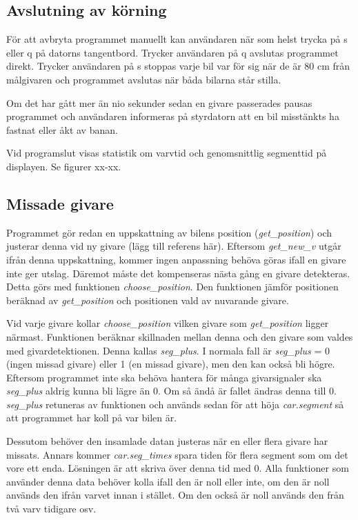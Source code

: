 \documentclass[10pt,oneside,swedish]{lips-no_customer}
\begin{document}
\subsection{Avslutning av körning}

För att avbryta programmet manuellt kan användaren när som helst trycka på s
eller q på datorns tangentbord. Trycker användaren på q avslutas programmet
direkt. Trycker användaren på s stoppas varje bil var för sig när de är 80 cm
från målgivaren och programmet avslutas när båda bilarna står stilla.

Om det har gått mer än nio sekunder sedan en givare passerades pausas programmet
och användaren informeras på styrdatorn att en bil misstänkts ha fastnat eller
åkt av banan. 

Vid programslut visas statistik om varvtid och genomsnittlig segmenttid på
displayen. Se figurer xx-xx.

\subsection{Missade givare}

Programmet gör redan en uppskattning av bilens position (\emph{get\_position})
 och justerar denna vid ny givare (lägg till referens här).
Eftersom \emph{get\_new\_v} utgår ifrån denna uppskattning, kommer ingen
anpassning behöva göras ifall en givare inte ger utslag. Däremot måste det 
kompenseras nästa gång en givare detekteras. Detta görs med funktionen 
\emph{choose\_position}. Den funktionen jämför positionen beräknad av 
\emph{get\_position} och positionen vald av nuvarande givare. 

Vid varje givare kollar \emph{choose\_position} vilken givare som 
\emph{get\_position} ligger närmast. Funktionen beräknar skillnaden mellan denna
och den givare som valdes med givardetektionen. Denna kallas \emph{seg\_plus}.
I normala fall är \emph{seg\_plus} = 0 (ingen 
missad givare) eller 1 (en missad givare), men den kan också bli högre. Eftersom
programmet inte ska behöva hantera för många givarsignaler ska \emph{seg\_plus}
aldrig kunna bli lägre än 0. Om så ändå är fallet ändras denna till 0. \emph{seg\_plus} 
retuneras av funktionen och används sedan för att höja \emph{car.segment} så att
programmet har koll på var bilen är.

Dessutom behöver den insamlade datan justeras när en eller flera givare har 
missats. Annars kommer \emph{car.seg\_times} spara tiden för flera segment som 
om det vore ett enda. Lösningen är att skriva över denna tid med 0. Alla 
funktioner som använder denna data behöver kolla ifall den är noll eller inte, 
om den är noll används den ifrån varvet innan i stället. Om den också är noll 
används den från två varv tidigare osv.
\end{document}
